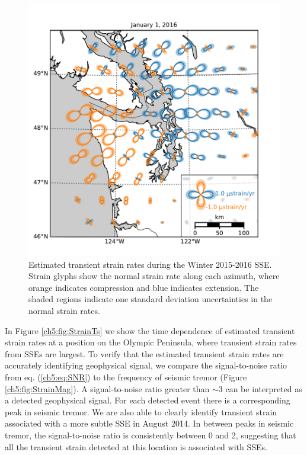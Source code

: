 \begin{figure}
\includegraphics{ch5/figures/strain_map/strain-map.pdf}
\caption{Estimated transient strain rates during the Winter 2015-2016
SSE. Strain glyphs show the normal strain rate along each azimuth,
where orange indicates compression and blue indicates extension. The
shaded regions indicate one standard deviation uncertainties in the
normal strain rates.}
\label{ch5:fig:StrainMap}
\end{figure}

In Figure \ref{ch5:fig:StrainTs} we show the time dependence of
estimated transient strain rates at a position on the Olympic
Peninsula, where transient strain rates from SSEs are largest. To
verify that the estimated transient strain rates are accurately
identifying geophysical signal, we compare the signal-to-noise ratio
from eq. (\ref{ch5:eq:SNR}) to the frequency of seismic tremor (Figure
\ref{ch5:fig:StrainMag}). A signal-to-noise ratio greater than
${\sim}3$ can be interpreted as a detected geophysical signal. For
each detected event there is a corresponding peak in seismic tremor.
We are also able to clearly identify transient strain associated with
a more subtle SSE in August 2014. In between peaks in seismic tremor,
the signal-to-noise ratio is consistently between 0 and 2, suggesting
that all the transient strain detected at this location is associated
with SSEs.

